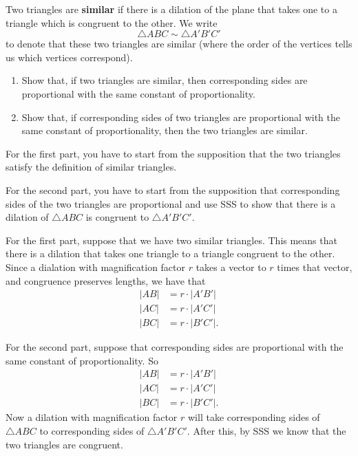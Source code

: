 \documentclass{ximera}
\begin{document}
\begin{definition}
Two triangles are \textbf{similar} if there is a dilation of the
plane that takes one to a triangle which is congruent to the other. We write%
\[
\triangle ABC\sim\triangle A'B'C'%
\]
to denote that these two triangles are similar (where the order of the
vertices tells us which vertices correspond).
\end{definition}

\begin{question}\hfil
\begin{enumerate}
\item Show that, if two triangles are similar, then corresponding
sides are proportional with the same constant of proportionality.

\item Show that, if corresponding sides of two triangles are
  proportional with the same constant of proportionality, then the two
  triangles are similar.


\end{enumerate}
\begin{solution}
\begin{hint}
For the first part, you have to start from the supposition that the
two triangles satisfy the definition of similar triangles.
\end{hint}
\begin{hint}
For the second part, you have to start from the supposition that
corresponding sides of the two triangles are proportional and use SSS
to show that there is a dilation of $\triangle ABC$ is congruent to
$\triangle A'B'C'$.
\end{hint}
For the first part, suppose that we have two similar triangles. This
means that there is a dilation that takes one triangle to a triangle
congruent to the other. Since a dialation with magnification factor
$r$ takes a vector to $r$ times that vector, and congruence preserves
lengths, we have that
\begin{align*}
|AB| &= r\cdot |A'B'|\\
|AC| &= r\cdot |A'C'|\\
|BC| &= r\cdot |B'C'|.
\end{align*}


For the second part, suppose that corresponding sides are proportional
with the same constant of proportionality. So
\begin{align*}
|AB| &= r\cdot |A'B'|\\
|AC| &= r\cdot |A'C'|\\
|BC| &= r\cdot |B'C'|.
\end{align*}
Now a dilation with magnification factor $r$ will take corresponding
sides of $\triangle ABC$ to corresponding sides of $\triangle
A'B'C'$. After this, by SSS we know that the two triangles are
congruent.
\end{solution}
\end{question}
\end{document}
